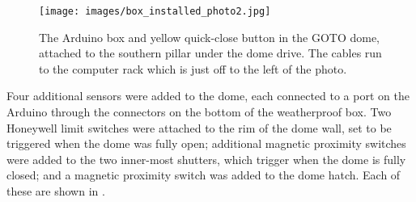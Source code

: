 \begin{colsection}
\begin{colsection}
\begin{figure}[p]
    \begin{center}
        \texttt{[image: images/box\_installed\_photo2.jpg]}
    \end{center}
    \caption[The Arduino box and quick-close button in the GOTO dome]{
        The Arduino box and yellow quick-close button in the GOTO dome, attached to the southern pillar under the dome drive. The cables run to the computer rack which is just off to the left of the photo.
    }\label{fig:arduino_button_dome}
\end{figure}

\clearpage

Four additional sensors were added to the dome, each connected to a port on the Arduino through the connectors on the bottom of the weatherproof box. Two Honeywell limit switches were attached to the rim of the dome wall, set to be triggered when the dome was fully open; additional magnetic proximity switches were added to the two inner-most shutters, which trigger when the dome is fully closed; and a magnetic proximity switch was added to the dome hatch. Each of these are shown in .


\end{colsection}
\end{colsection}
